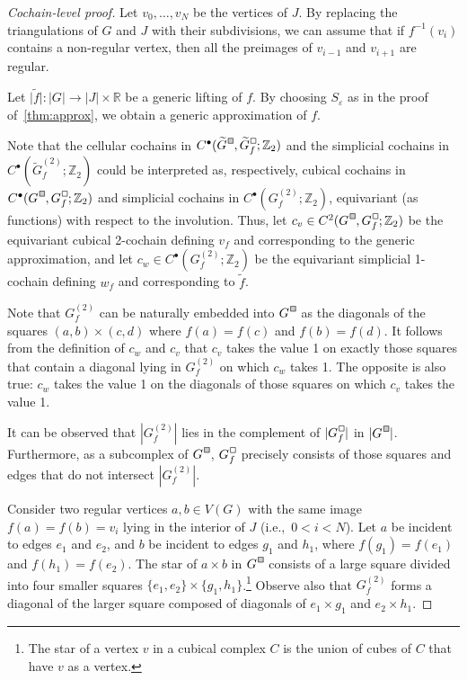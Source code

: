 \documentclass[a4paper,12pt,reqno,oneside]{amsart}
\theoremstyle{plain}
\theoremstyle{definition}
\theoremstyle{plain}
\newcommand{\from}{\colon}
\newcommand{\wt}[1]{\widetilde{#1}}
\newcommand{\R}{\mathbb{R}}
\newcommand{\Z}{\mathbb{Z}}
\newcommand{\gbox}{\tikz{\node[shape=rectangle,fill=black!20,draw,inner sep=0.7mm,align=center] (char) {};}}
\newcommand{\wbox}{\tikz{\node[shape=rectangle,draw,inner sep=0.7mm,align=center] (char) {};}}
\newcommand*\Gc{G^{\hspace{1pt}\raisebox{0.8pt}{\gbox}}}
\newcommand*\wGc{\wt{G}^{\hspace{1pt}\raisebox{0.8pt}{\gbox}}}
\newcommand*\Gcf{G^{\hspace{1pt}\raisebox{0.8pt}{\wbox}}_{f}}
\newcommand*\wGcf{\wt{G}^{\hspace{1pt}\raisebox{0.8pt}{\wbox}}_{f}}
\begin{document}
\begin{proof}[Cochain-level proof]
  Let $v_0, \dots, v_N$ be the vertices of $J$. By replacing the triangulations of $G$ and $J$ with
  their subdivisions, we can assume that if $f^{-1}(v_i)$ contains a non-regular vertex, then all the
  preimages of $v_{i-1}$ and $v_{i+1}$ are regular.

  Let $\wt{|f|} \from |G| \to |J| \times \R$ be a generic lifting of $f$. By choosing
  $S_\varepsilon$ as in the proof of~\cref{thm:approx}, we obtain a generic approximation of
  $f$.

  Note that the cellular cochains in $C^\bullet(\wGc, \wGcf; \Z_2)$ and the simplicial cochains in
  $C^\bullet(\wt{G}^{(2)}_f; \Z_2)$ could be interpreted as, respectively, cubical cochains in
  $C^\bullet(\Gc, \Gcf; \Z_2)$ and simplicial cochains in $C^\bullet(G^{(2)}_f; \Z_2)$, equivariant
  (as functions) with respect to the involution. Thus, let $c_v \in C^2(\Gc, \Gcf; \Z_2)$ be the
  equivariant cubical 2-cochain defining $v_f$ and corresponding to the generic approximation, and
  let $c_w \in C^\bullet(G^{(2)}_f; \Z_2)$ be the equivariant simplicial 1-cochain defining $w_f$
  and corresponding to $\wt{f}$.

  Note that $G^{(2)}_f$ can be naturally embedded into $\Gc$ as the diagonals of the squares
  $(a, b) \times (c, d)$ where $f(a) = f(c)$ and $f(b) = f(d)$. It follows from the definition of
  $c_w$ and $c_v$ that $c_v$ takes the value 1 on exactly those squares that contain a diagonal
  lying in $G^{(2)}_f$ on which $c_w$ takes 1. The opposite is also true: $c_w$ takes the value 1 on
  the diagonals of those squares on which $c_v$ takes the value 1.

  It can be observed that $|G^{(2)}_f|$ lies in the complement of $|\Gcf|$ in $|\Gc|$.
  Furthermore, as a subcomplex of $\Gc$, $\Gcf$ precisely consists of those squares
  and edges that do not intersect $|G^{(2)}_f|$.

  Consider two regular vertices $a, b \in V(G)$ with the same image $f(a) = f(b) = v_i$ lying in the
  interior of $J$ (i.e.,~$0 < i < N$). Let $a$ be incident to edges $e_1$ and $e_2$, and $b$
  be incident to edges $g_1$ and $h_1$, where $f(g_1) = f(e_1)$ and $f(h_1) = f(e_2)$. The star of
  $a \times b$ in $\Gc$ consists of a large square divided into four smaller squares
  $\{e_1, e_2\} \times \{g_1, h_1\}$.\footnote{The star of a vertex
    $v$ in a cubical complex $C$ is the union of cubes of $C$ that have $v$ as a vertex.} Observe
  also that $G^{(2)}_f$ forms a diagonal of the larger square composed of diagonals of
  $e_1 \times g_1$ and $e_2 \times h_1$.


\end{proof}
\end{document}
